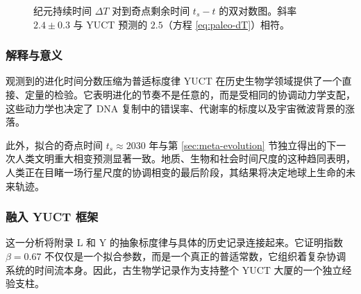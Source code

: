 \documentclass[12pt,a4paper]{article}
\theoremstyle{remark}
\begin{document}
		\begin{figure}[htbp]
			\centering
			\caption{纪元持续时间 $\Delta T$ 对到奇点剩余时间 $t_s - t$ 的双对数图。斜率 $2.4 \pm 0.3$ 与 YUCT 预测的 $2.5$（方程 \ref{eq:paleo-dT}）相符。}
			\label{fig:paleo-scaling}
		\end{figure}
		
		\subsubsection{解释与意义}
		
		观测到的进化时间分数压缩为普适标度律 YUCT 在历史生物学领域提供了一个直接、定量的检验。它表明进化的节奏不是任意的，而是受相同的协调动力学支配，这些动力学也决定了 DNA 复制中的错误率、代谢率的标度以及宇宙微波背景的涨落。
		
		此外，拟合的奇点时间 $t_s \approx 2030$ 年与第 \ref{sec:meta-evolution} 节独立得出的下一次人类文明重大相变预测显著一致。地质、生物和社会时间尺度的这种趋同表明，人类正在目睹一场行星尺度的协调相变的最后阶段，其结果将决定地球上生命的未来轨迹。
		
		\subsubsection{融入 YUCT 框架}
		
		这一分析将附录 L 和 Y 的抽象标度律与具体的历史记录连接起来。它证明指数 $\beta = 0.67$ 不仅仅是一个拟合参数，而是一个真正的普适常数，它组织着复杂协调系统的时间流本身。因此，古生物学记录作为支持整个 YUCT 大厦的一个独立经验支柱。
		
\end{document}
